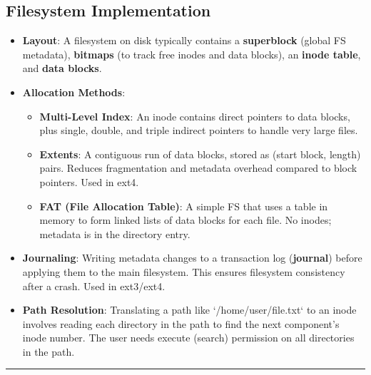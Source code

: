 \documentclass[8pt,a4paper]{article}
\newcommand{\sectiondivider}{\vspace{4pt}\hrule\vspace{4pt}}
\begin{document}
\begin{multicols}{2}
\subsection*{Filesystem Implementation}
\begin{itemize}
    \item \textbf{Layout}: A filesystem on disk typically contains a \textbf{superblock} (global FS metadata), \textbf{bitmaps} (to track free inodes and data blocks), an \textbf{inode table}, and \textbf{data blocks}.
    \item \textbf{Allocation Methods}:
        \begin{itemize}
            \item \textbf{Multi-Level Index}: An inode contains direct pointers to data blocks, plus single, double, and triple indirect pointers to handle very large files.
            \item \textbf{Extents}: A contiguous run of data blocks, stored as (start block, length) pairs. Reduces fragmentation and metadata overhead compared to block pointers. Used in ext4.
            \item \textbf{FAT (File Allocation Table)}: A simple FS that uses a table in memory to form linked lists of data blocks for each file. No inodes; metadata is in the directory entry.
        \end{itemize}
    \item \textbf{Journaling}: Writing metadata changes to a transaction log (\textbf{journal}) before applying them to the main filesystem. This ensures filesystem consistency after a crash. Used in ext3/ext4.
    \item \textbf{Path Resolution}: Translating a path like `/home/user/file.txt` to an inode involves reading each directory in the path to find the next component's inode number. The user needs execute (search) permission on all directories in the path.
\end{itemize}

\sectiondivider

\end{multicols}
\end{document}
